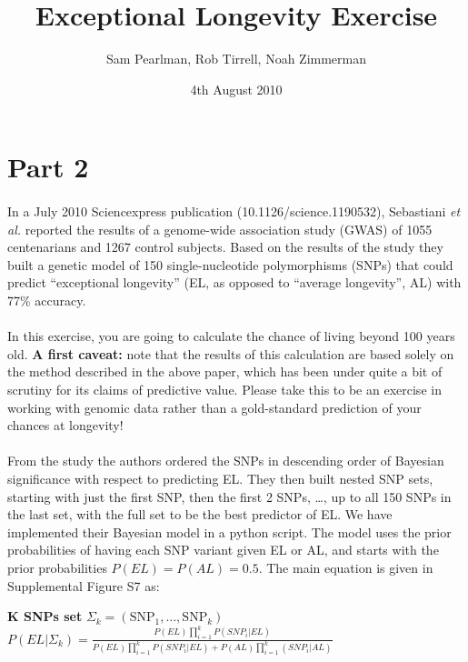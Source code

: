 \documentclass[a4paper, 12pt]{article}
\title{Exceptional Longevity Exercise}
\author{Sam Pearlman, Rob Tirrell, Noah Zimmerman}
\date{4th August 2010}
\begin{document}
\maketitle

\section*{Part 2}

\paragraph{} 
  In a July 2010 Sciencexpress publication (10.1126/science.1190532), Sebastiani \emph{et al.} reported the results of a genome-wide association study (GWAS) of 1055 centenarians and 1267 control subjects. 
  Based on the results of the study they built a genetic model of 150 single-nucleotide polymorphisms (SNPs) that could predict ``exceptional longevity'' (EL, as opposed to ``average longevity'', AL) with 77\% accuracy.

\paragraph{}
  In this exercise, you are going to calculate the chance of living beyond 100 years old.
  \textbf{A first caveat:} note that the results of this calculation are based solely on the method described in the above paper, which has been under quite a bit of scrutiny for its claims of predictive value. 
  Please take this to be an exercise in working with genomic data rather than a gold-standard prediction of your chances at longevity!

\paragraph{}
  From the study the authors ordered the SNPs in descending order of Bayesian significance with respect to predicting EL. 
  They then built nested SNP sets, starting with just the first SNP, then the first 2 SNPs, \ldots, up to all 150 SNPs in the last set, with the full set to be the best predictor of EL.
  We have implemented their Bayesian model in a python script. The model uses the prior probabilities of having each SNP variant given EL or AL, and starts with the prior probabilities $P(EL) = P(AL) = 0.5$. The main equation is given in Supplemental Figure S7 as: \\
  \begin{center}
    \textbf{K SNPs set} $\Sigma_k = (\mathrm{SNP}_1, \ldots, \mathrm{SNP}_k)$ \\
  $P(EL | \Sigma_k) = \frac{P(EL) \prod_{i = 1} ^ k P(SNP_i | EL)}{P(EL) \prod_{i = 1} ^ k P(SNP_i | EL) + P(AL) \prod_{i = 1} ^ k (SNP_i | AL)}$ \\
  \end{center}
\end{document}
